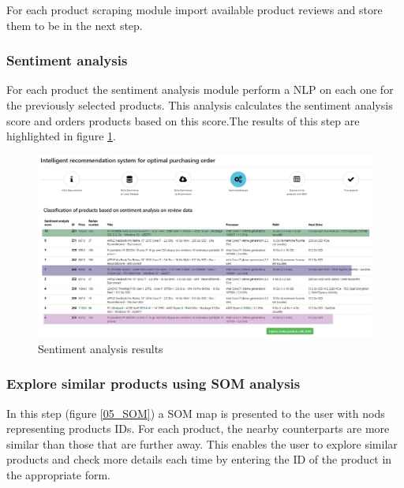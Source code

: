 \documentclass[preprint,3p,onecolumn]{elsarticle}
\begin{document}
\par For each product scraping module import available product reviews and store them to be in the next step.

\subsubsection{Sentiment analysis}

\par For each product the sentiment analysis module perform a NLP on each one
for the previously selected products. This analysis calculates the sentiment analysis score and orders products based on this score.The results of this step are highlighted in figure \ref{04_Sentiment_analysis}.

\begin{figure}[H]
\centering
\includegraphics[scale=.3]{04_Sentiment_analysis}
\caption{Sentiment analysis results}
\label{04_Sentiment_analysis}
\end{figure}

\subsubsection{Explore similar products using SOM analysis}

\par In this step (figure \ref{05_SOM}) a SOM map is presented to the user with nods representing products IDs. For each product, the nearby counterparts are more similar than those that are further away. This enables the user to explore similar products and check more details each time by entering the ID of the product in the appropriate form.
\end{document}
